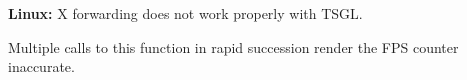 
\begin{DoxyRefList}
\item[Class \mbox{\hyperlink{classtsgl_1_1_canvas}{tsgl::Canvas}} ]\label{bug__bug000002}%
%
{\bfseries{Linux\+:}} X forwarding does not work properly with T\+S\+GL.  
\item[Member \mbox{\hyperlink{classtsgl_1_1_canvas_a495a17e5431804442a6e4196f9c01fce}{tsgl::Canvas::take\+Screen\+Shot}} (const std\+::string \&new\+Capture\+Prefix=\char`\"{}\char`\"{})]\label{bug__bug000001}%
%
Multiple calls to this function in rapid succession render the F\+PS counter inaccurate. 
\end{DoxyRefList}